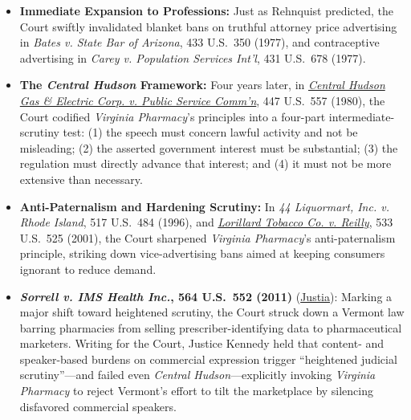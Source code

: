 \documentclass[12pt]{article}
\begin{document}
\begin{itemize}

\item \textbf{Immediate Expansion to Professions:} Just as Rehnquist predicted, the Court swiftly invalidated blanket bans on truthful attorney price advertising in \textit{Bates v. State Bar of Arizona}, 433 U.S.\ 350 (1977), and contraceptive advertising in \textit{Carey v. Population Services Int'l}, 431 U.S.\ 678 (1977).
  \item \textbf{The \textit{Central Hudson} Framework:} Four years later, in \href{https://supreme.justia.com/cases/federal/us/447/557/}{\textit{Central Hudson Gas \& Electric Corp. v. Public Service Comm'n}}, 447 U.S.\ 557 (1980), the Court codified \textit{Virginia Pharmacy}'s principles into a four-part intermediate-scrutiny test: (1) the speech must concern lawful activity and not be misleading; (2) the asserted government interest must be substantial; (3) the regulation must directly advance that interest; and (4) it must not be more extensive than necessary.
  \item \textbf{Anti-Paternalism and Hardening Scrutiny:} In \textit{44 Liquormart, Inc. v. Rhode Island}, 517 U.S.\ 484 (1996), and \href{https://supreme.justia.com/cases/federal/us/533/525/}{\textit{Lorillard Tobacco Co. v. Reilly}}, 533 U.S.\ 525 (2001), the Court sharpened \textit{Virginia Pharmacy}'s anti-paternalism principle, striking down vice-advertising bans aimed at keeping consumers ignorant to reduce demand.
  \item \textbf{\textit{Sorrell v. IMS Health Inc.}, 564 U.S.\ 552 (2011)} (\href{https://supreme.justia.com/cases/federal/us/564/552/}{Justia}): Marking a major shift toward heightened scrutiny, the Court struck down a Vermont law barring pharmacies from selling prescriber-identifying data to pharmaceutical marketers. Writing for the Court, Justice Kennedy held that content- and speaker-based burdens on commercial expression trigger ``heightened judicial scrutiny''---and failed even \textit{Central Hudson}---explicitly invoking \textit{Virginia Pharmacy} to reject Vermont's effort to tilt the marketplace by silencing disfavored commercial speakers.

\end{itemize}
\end{document}
